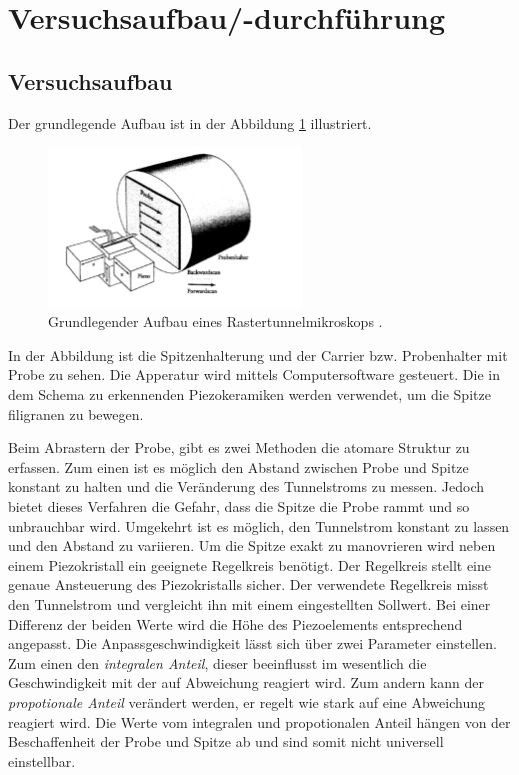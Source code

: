 \section{Versuchsaufbau/-durchführung}

\subsection{Versuchsaufbau}
Der grundlegende Aufbau ist in der Abbildung \ref{fig: aufbau} illustriert.
\begin{figure}[!h]
  \centering
  \includegraphics[width=0.6\textwidth]{./pics/aufbau.png}
  \caption{Grundlegender Aufbau eines Rastertunnelmikroskops \cite{anleitung_frankfurt}.}
  \label{fig: aufbau}
\end{figure}
In der Abbildung ist die Spitzenhalterung und
der Carrier bzw. Probenhalter mit Probe zu sehen. Die Apperatur wird mittels Computersoftware gesteuert.
Die in dem Schema zu erkennenden Piezokeramiken werden
verwendet, um die Spitze filigranen zu bewegen.

Beim Abrastern der Probe, gibt es zwei Methoden die atomare Struktur zu erfassen.
Zum einen ist es möglich den Abstand zwischen Probe und Spitze konstant zu halten
und die Veränderung des Tunnelstroms zu messen.
Jedoch bietet dieses Verfahren die Gefahr, dass die Spitze die Probe rammt und so unbrauchbar wird.
Umgekehrt ist es möglich, den Tunnelstrom konstant zu lassen und den Abstand zu variieren.
Um die Spitze exakt zu manovrieren wird neben einem Piezokristall ein geeignete Regelkreis benötigt.
Der Regelkreis stellt eine genaue Ansteuerung des Piezokristalls sicher.
Der verwendete Regelkreis misst den Tunnelstrom und vergleicht ihn mit einem
eingestellten Sollwert. Bei einer Differenz der beiden Werte wird die Höhe des Piezoelements
entsprechend angepasst. Die Anpassgeschwindigkeit lässt sich über zwei Parameter
einstellen. Zum einen den \emph{integralen Anteil}, dieser beeinflusst im wesentlich die
Geschwindigkeit mit der auf Abweichung reagiert wird. Zum andern kann der
\emph{propotionale Anteil} verändert werden,
er regelt wie stark auf eine Abweichung reagiert wird.
Die Werte vom integralen und propotionalen Anteil hängen von der Beschaffenheit
der Probe und Spitze ab \cite{anleitung_frankfurt} und sind somit nicht universell einstellbar.

